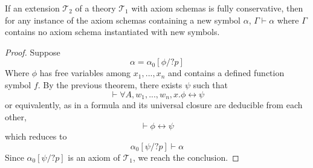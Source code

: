 \begin{thm}

	If an extension $\mathcal{T}_2$ of a theory $\mathcal{T}_1$ with axiom schemas is fully conservative, then for any instance of the axiom schemas containing a new symbol $\alpha$, $\Gamma \vdash \alpha$ where $\Gamma$ contains no axiom schema instantiated with new symbols.

\end{thm}
\begin{proof}
	Suppose
	$$
		\alpha = \alpha_0[\phi / ?p]
	$$
	Where $\phi$ has free variables among $x_1,...,x_n$ and contains a defined function symbol $f$. By the previous theorem, there exists $\psi$ such that
	$$\vdash \forall A, w_1, ..., w_n, x. \phi \leftrightarrow \psi$$
	or equivalently, as in a formula and its universal closure are deducible from each other,
	$$\vdash \phi \leftrightarrow \psi$$
	which reduces to
	$$
		\alpha_0[\psi / ?p] \vdash \alpha
	$$
	Since $\alpha_0[\psi / ?p]$ is an axiom of $\mathcal{T}_1$, we reach the conclusion.
\end{proof}

